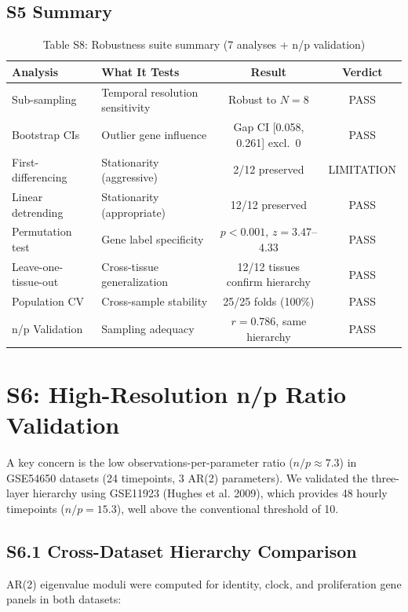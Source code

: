 \documentclass[11pt,a4paper]{article}
\begin{document}
\subsection{S5 Summary}

\begin{table}[H]
\centering
\caption{Table S8: Robustness suite summary (7 analyses + n/p validation)}
\label{tab:robustness_summary}
\begin{tabular}{llcc}
\toprule
Analysis & What It Tests & Result & Verdict \\
\midrule
Sub-sampling & Temporal resolution sensitivity & Robust to $N=8$ & PASS \\
Bootstrap CIs & Outlier gene influence & Gap CI [0.058, 0.261] excl.\ 0 & PASS \\
First-differencing & Stationarity (aggressive) & 2/12 preserved & LIMITATION \\
Linear detrending & Stationarity (appropriate) & 12/12 preserved & PASS \\
Permutation test & Gene label specificity & $p < 0.001$, $z = 3.47$--$4.33$ & PASS \\
Leave-one-tissue-out & Cross-tissue generalization & 12/12 tissues confirm hierarchy & PASS \\
Population CV & Cross-sample stability & 25/25 folds (100\%) & PASS \\
\midrule
n/p Validation & Sampling adequacy & $r=0.786$, same hierarchy & PASS \\
\bottomrule
\end{tabular}
\end{table}

\section{S6: High-Resolution n/p Ratio Validation}

A key concern is the low observations-per-parameter ratio ($n/p \approx 7.3$) in GSE54650 datasets (24 timepoints, 3 AR(2) parameters). We validated the three-layer hierarchy using GSE11923 (Hughes et al. 2009), which provides 48 hourly timepoints ($n/p = 15.3$), well above the conventional threshold of 10.

\subsection{S6.1 Cross-Dataset Hierarchy Comparison}

AR(2) eigenvalue moduli were computed for identity, clock, and proliferation gene panels in both datasets:
\end{document}
